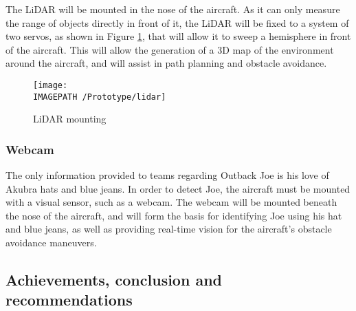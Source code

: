 The LiDAR will be mounted in the nose of the aircraft. As it can only measure the range of objects directly in front of it, the LiDAR will be fixed to a system of two servos, as shown in Figure \ref{fig:lidar-exec}, that will allow it to sweep a hemisphere in front of the aircraft. This will allow the generation of a 3D map of the environment around the aircraft, and will assist in path planning and obstacle avoidance.

\begin{figure}[!ht]
	\centering
	\texttt{[image: \\IMAGEPATH /Prototype/lidar]}
	\caption{LiDAR mounting}
	\label{fig:lidar-exec}
\end{figure}

\subsubsection*{Webcam}
The only information provided to teams regarding Outback Joe is his love of Akubra hats and blue jeans. In order to detect Joe, the aircraft must be mounted with a visual sensor, such as a webcam. The webcam will be mounted beneath the nose of the aircraft, and will form the basis for identifying Joe using his hat and blue jeans, as well as providing real-time vision for the aircraft's obstacle avoidance maneuvers.

\subsection{Achievements, conclusion and recommendations}